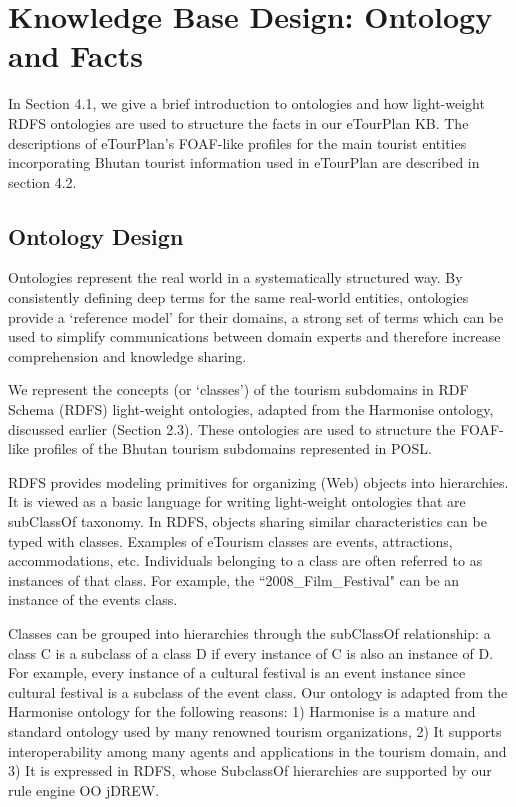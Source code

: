 \chapter{Knowledge Base Design: Ontology and Facts}

\hspace{0.3in} In Section 4.1, we give a brief introduction to ontologies and how light-weight RDFS ontologies are used to structure the facts in our eTourPlan KB. The descriptions of eTourPlan's FOAF-like profiles for the main tourist entities incorporating Bhutan tourist information used in eTourPlan are described in section 4.2. 

\section{Ontology Design}
\hspace{0.3in} Ontologies represent the real world in a systematically structured way. By consistently defining deep terms for the same real-world entities, ontologies provide a `reference model' for their domains, a strong set of terms which can be used to simplify communications between domain experts and therefore increase comprehension and knowledge sharing.

\hspace{0.3in} We represent the concepts (or `classes') of the tourism subdomains in RDF Schema (RDFS) light-weight ontologies, adapted from the Harmonise ontology, discussed earlier (Section 2.3). These ontologies are used to structure the FOAF-like profiles of the Bhutan tourism subdomains represented in POSL. 

\hspace{0.3in}RDFS provides modeling primitives for organizing (Web) objects into hierarchies. It is viewed as a basic language for writing light-weight ontologies that are subClassOf taxonomy. In RDFS, objects sharing similar characteristics can be typed with classes. Examples of eTourism classes are events, attractions, accommodations, etc.  Individuals belonging to a class are often referred to as instances of that class. For example, the ``2008\_Film\_Festival" can be an instance of the events class.

\hspace{0.3in}Classes can be grouped into hierarchies through the subClassOf relationship: a class C is a subclass of a class D if every instance of C is also an instance of D. For example, every instance of a cultural festival is an event instance since cultural festival is a subclass of the event class. Our ontology is adapted from the Harmonise ontology for the following reasons: 1) Harmonise is a mature and standard ontology used by many renowned tourism organizations, 2) It supports interoperability among many agents and applications in the tourism domain, and 3) It is expressed in RDFS, whose SubclassOf hierarchies are supported by our rule engine OO jDREW.

